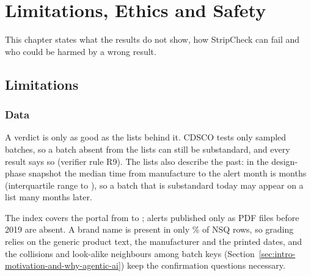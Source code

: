 \chapter{Limitations, Ethics and Safety}
\label{ch:lim}

This chapter states what the results do not show, how StripCheck can fail and who could be harmed by a wrong result.

\section{Limitations}
\label{sec:lim-limitations}

\subsection{Data}
A \NLISTED{} verdict is only as good as the lists behind it. CDSCO tests only sampled batches, so a batch absent from the lists can still be substandard, and every \NLISTED{} result says so (verifier rule R9). The lists also describe the past: in the design-phase snapshot the median time from manufacture to the alert month is \LagMedian{} months (interquartile range \LagQOne{} to \LagQThree{}), so a batch that is substandard today may appear on a list many months later.

The index covers the portal from \FirstMonth{} to \LastMonth{}; alerts published only as PDF files before 2019 are absent. A brand name is present in only \BrandPresentPct\% of NSQ rows, so grading relies on the generic product text, the manufacturer and the printed dates, and the collisions and look-alike neighbours among batch keys (Section~\ref{sec:intro-motivation-and-why-agentic-ai}) keep the confirmation questions necessary.

